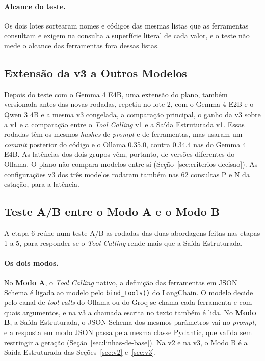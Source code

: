 \paragraph{Alcance do teste.} Os dois lotes sortearam nomes e códigos das mesmas listas que as ferramentas consultam e exigem na consulta a superfície literal de cada valor, e o teste não mede o alcance das ferramentas fora dessas listas.

\subsection{Extensão da v3 a Outros Modelos}
\label{sec:extensao-metodo}

Depois do teste com o Gemma 4 E4B, uma extensão do plano, também versionada antes das novas rodadas, repetiu no lote 2, com o Gemma 4 E2B e o Qwen 3 4B e a mesma v3 congelada, a comparação principal, o ganho da v3 sobre a v1 e a comparação entre o \textit{Tool Calling} v1 e a Saída Estruturada v1. Essas rodadas têm os mesmos \textit{hashes} de \textit{prompt} e de ferramentas, mas usaram um \textit{commit} posterior do código e o Ollama 0.35.0, contra 0.34.4 nas do Gemma 4 E4B. As latências dos dois grupos vêm, portanto, de versões diferentes do Ollama. O plano não compara modelos entre si (Seção~\ref{sec:criterios-decisao}). As configurações v3 dos três modelos rodaram também nas 62 consultas P e N da estação, para a latência.

\subsection{Teste A/B entre o Modo A e o Modo B}
\label{sec:ab-metodo}

A etapa 6 reúne num teste A/B as rodadas das duas abordagens feitas nas etapas 1 a 5, para responder se o \textit{Tool Calling} rende mais que a Saída Estruturada.

\paragraph{Os dois modos.} No \textbf{Modo A}, o \textit{Tool Calling} nativo, a definição das ferramentas em JSON Schema é ligada ao modelo pelo \texttt{bind\_tools()} do LangChain. O modelo decide pelo canal de \textit{tool calls} do Ollama ou do Groq se chama cada ferramenta e com quais argumentos, e na v3 a chamada escrita no texto também é lida. No \textbf{Modo B}, a Saída Estruturada, o JSON Schema dos mesmos parâmetros vai no \textit{prompt}, e a resposta em modo JSON passa pela mesma classe Pydantic, que valida sem restringir a geração (Seção~\ref{sec:linhas-de-base}). Na v2 e na v3, o Modo B é a Saída Estruturada das Seções~\ref{sec:v2} e~\ref{sec:v3}.

